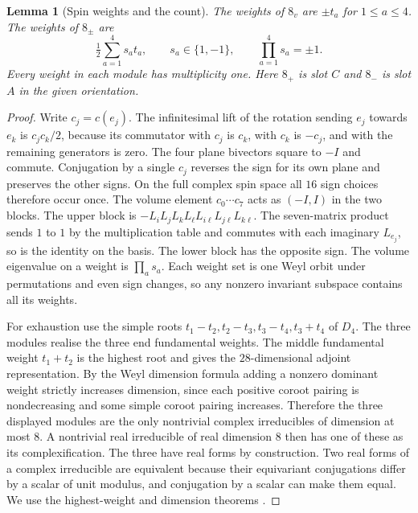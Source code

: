 \documentclass[aps,pra,onecolumn,superscriptaddress,nofootinbib,10pt]{revtex4-2}
\newtheorem{lemma}[theorem]{Lemma}
\theoremstyle{definition}
\theoremstyle{remark}
\begin{document}
\begin{lemma}[Spin weights and the count]\label{tr:spinweights}
The weights of \(8_v\) are \(\pm t_a\) for \(1\leq a\leq4\).
The weights of \(8_\pm\) are
\[
 \tfrac12\sum_{a=1}^{4}s_a t_a,\qquad s_a\in\{1,-1\},\qquad
 \prod_{a=1}^{4}s_a=\pm1.
\]
Every weight in each module has multiplicity one. Here \(8_+\)
is slot \(C\) and \(8_-\) is slot \(A\) in the given orientation.
\end{lemma}
\begin{proof}
Write \(c_j=c(e_j)\). The infinitesimal lift of the rotation
sending \(e_j\) towards \(e_k\) is \(c_jc_k/2\), because its commutator
with \(c_j\) is \(c_k\), with \(c_k\) is \(-c_j\), and with the
remaining generators is zero. The four plane bivectors square to
\(-I\) and commute. Conjugation by a single \(c_j\) reverses the sign
for its own plane and preserves the other signs. On the full complex
spin space all \(16\) sign choices therefore occur once.
The volume element \(c_0\cdots c_7\) acts as \((-I,I)\) in the
two blocks. The upper block is \(-L_iL_jL_kL_\ell L_{i\ell}L_{j\ell}L_{k\ell}\).
The seven-matrix product sends \(1\) to \(1\) by the multiplication
table and commutes with each imaginary \(L_{e_j}\), so is the identity
on the basis. The lower block has the opposite sign.
The volume eigenvalue on a weight is \(\prod_a s_a\).
Each weight set is one Weyl orbit under permutations and even sign
changes, so any nonzero invariant subspace contains all its weights.

For exhaustion use the simple roots \(t_1-t_2,t_2-t_3,t_3-t_4,t_3+t_4\)
of \(D_4\). The three modules realise the three end fundamental
weights. The middle fundamental weight \(t_1+t_2\) is the highest
root and gives the \(28\)-dimensional adjoint representation.
By the Weyl dimension formula adding a nonzero dominant weight
strictly increases dimension, since each positive coroot pairing
is nondecreasing and some simple coroot pairing increases.
Therefore the three displayed modules are the only nontrivial
complex irreducibles of dimension at most \(8\). A nontrivial real
irreducible of real dimension \(8\) then has one of these as its
complexification. The three have real forms by construction.
Two real forms of a complex irreducible are equivalent because
their equivariant conjugations differ by a scalar of unit modulus,
and conjugation by a scalar can make them equal. We use the
highest-weight and dimension theorems \cite[\S\S21, 24]{tr:Humphreys}.
\end{proof}
\end{document}
